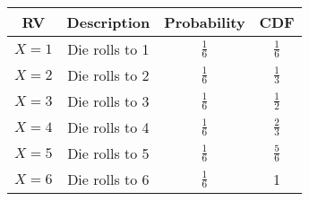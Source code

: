 
\begin{center}
\begin{tabular}{|c|c|c|c|}
\hline
\textbf{RV} & \textbf{Description} & \textbf{Probability} & \textbf{CDF}\\ \hline
$X = 1$	    &   Die rolls to 1  & $\frac{1}{6}$ & $\frac{1}{6}$\\ \hline
$X = 2$	    &   Die rolls to 2  & $\frac{1}{6}$ & $\frac{1}{3}$\\ \hline
$X = 3$	    &   Die rolls to 3  & $\frac{1}{6}$ & $\frac{1}{2}$\\ \hline
$X = 4$	    &   Die rolls to 4  & $\frac{1}{6}$ & $\frac{2}{3}$\\ \hline
$X = 5$	    &   Die rolls to 5  & $\frac{1}{6}$ & $\frac{5}{6}$\\ \hline
$X = 6$	    &   Die rolls to 6  & $\frac{1}{6}$ & 1\\ \hline
\end{tabular}
\end{center}

